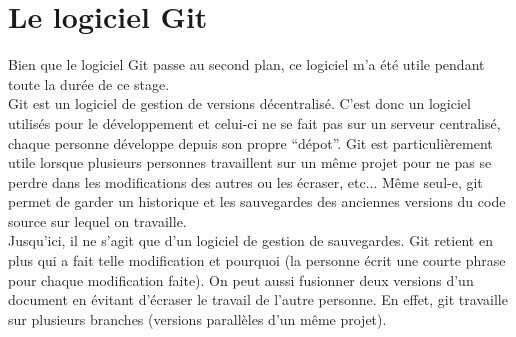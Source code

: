 \documentclass[a4paper]{article}
\begin{document}
\section*{Le logiciel Git}
Bien que le logiciel Git passe au second plan, ce logiciel m'a été utile pendant toute la durée de ce stage.\\
Git est un logiciel de gestion de versions décentralisé. C'est donc un logiciel utilisés pour le développement et celui-ci ne se fait pas sur un serveur centralisé, chaque personne développe depuis son propre ``dépot''. Git est particulièrement utile lorsque plusieurs personnes travaillent sur un même projet pour ne pas se perdre dans les modifications des autres ou les écraser, etc... Même seul-e, git permet de garder un historique et les sauvegardes des anciennes versions du code source sur lequel on travaille.\\
Jusqu'ici, il ne s'agit que d'un logiciel de gestion de sauvegardes. Git retient en plus qui a fait telle modification et pourquoi (la personne écrit une courte phrase pour chaque modification faite). On peut aussi fusionner deux versions d'un document en évitant d'écraser le travail de l'autre personne. En effet, git travaille sur plusieurs branches (versions parallèles d'un même projet).\vspace{1\baselineskip}\\
\end{document}
